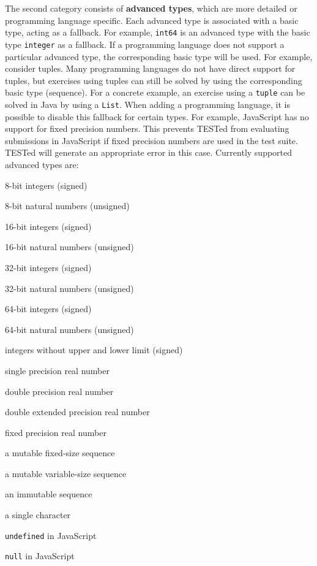 \documentclass[../main]{subfiles}
\begin{document}
The second category consists of \textbf{advanced types}, which are more detailed or programming language specific.
Each advanced type is associated with a basic type, acting as a fallback.
For example, \texttt{int64} is an advanced type with the basic type \texttt{integer} as a fallback.
If a programming language does not support a particular advanced type, the corresponding basic type will be used.
For example, consider tuples.
Many programming languages do not have direct support for tuples, but exercises using tuples can still be solved by using the corresponding basic type (sequence).
For a concrete example, an exercise using a \texttt{tuple} can be solved in Java by using a \texttt{List}.
When adding a programming language, it is possible to disable this fallback for certain types.
For example, JavaScript has no support for fixed precision numbers.
This prevents TESTed from evaluating submissions in JavaScript if fixed precision numbers are used in the test suite.
TESTed will generate an appropriate error in this case.
Currently supported advanced types are:

\begin{description}[noitemsep]
    \item[\texttt{int8}] 8-bit integers (signed)
    \item[\texttt{uint8}] 8-bit natural numbers (unsigned)
    \item[\texttt{int16}] 16-bit integers (signed)
    \item[\texttt{uint16}] 16-bit natural numbers (unsigned)
    \item[\texttt{int32}] 32-bit integers (signed)
    \item[\texttt{uint32}] 32-bit natural numbers (unsigned)
    \item[\texttt{int64}] 64-bit integers (signed)
    \item[\texttt{uint64}] 64-bit natural numbers (unsigned)
    \item[\texttt{bigint}] integers without upper and lower limit (signed)
    \item[\texttt{single\_precision}] single precision real number
    \item[\texttt{double\_precision}] double precision real number
    \item[\texttt{double\_extended}] double extended precision real number
    \item[\texttt{fixed\_precision}] fixed precision real number
    \item[\texttt{array}] a mutable fixed-size sequence
    \item[\texttt{list}] a mutable variable-size sequence
    \item[\texttt{tuple}] an immutable sequence
    \item[\texttt{char}] a single character
    \item[\texttt{undefined}] \texttt{undefined} in JavaScript
    \item[\texttt{null}] \texttt{null} in JavaScript
\end{description}
\end{document}
